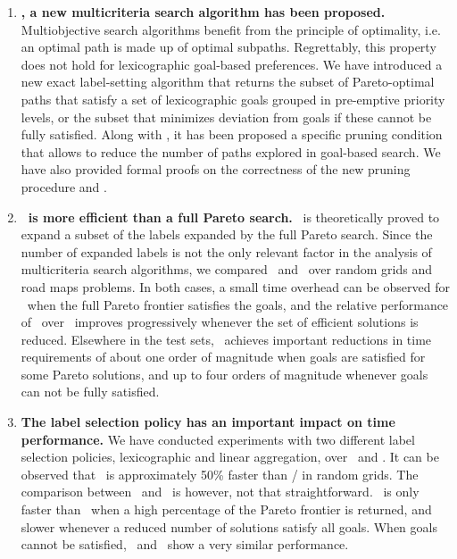 \begin{enumerate}

    \item \textbf{\lexgo, a new multicriteria search algorithm has been proposed.} Multiobjective search algorithms benefit from the principle of optimality, i.e. an optimal path is made up of optimal subpaths. Regrettably, this property does not hold for lexicographic goal-based preferences. We have introduced a new exact label-setting algorithm that returns the subset of Pareto-optimal paths that satisfy a set of lexicographic goals grouped in pre-emptive priority levels, or the subset that minimizes deviation from goals if these cannot be fully satisfied. Along with \lexgo, it has been proposed a specific pruning condition that allows to reduce the number of paths explored in goal-based search. We have also provided formal proofs on the correctness of the new pruning procedure and \lexgo.  

    \item \textbf{\lexgo \ is more efficient than a full Pareto search.} \lexgo \ is theoretically proved to expand a subset of the labels expanded by the full Pareto search. Since the number of expanded labels is not the only relevant factor in the analysis of multicriteria search algorithms, we compared \lexgo \ and \namoa \ over random grids and road maps problems. In both cases, a small time overhead can be observed for \lexgo \ when the full Pareto frontier satisfies the goals, and the relative performance of \lexgo \ over \namoa \ improves progressively whenever the set of efficient solutions is reduced. Elsewhere  in the test sets, \lexgo \ achieves important reductions in time requirements of about one order of magnitude when goals are satisfied for some Pareto solutions, and up to four orders of magnitude whenever goals can not be fully satisfied.  
    
    \item \textbf{The label selection policy has an important impact on time performance.} We have conducted experiments with two different label selection policies, lexicographic and linear aggregation, over \namoa \ and \lexgo. It can be observed that \namoalin \ is approximately 50\% faster than \namoalex / in random grids. The comparison between \lexgolex \ and \lexgolin \ is however, not that straightforward. \lexgolin \ is only faster than \lexgolex \ when a high percentage of the Pareto frontier is returned, and slower whenever a reduced number of solutions satisfy all goals. When goals cannot be satisfied, \lexgolex \ and \lexgolin \ show a very similar performance.
    

\end{enumerate}
